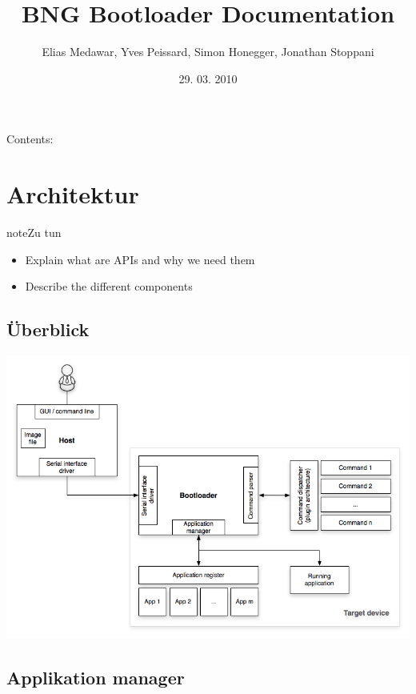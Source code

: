 \documentclass[letterpaper,10pt,ngerman]{manual}
\title{BNG Bootloader Documentation}
\date{29. 03. 2010}
\author{Elias Medawar, Yves Peissard, Simon Honegger, Jonathan Stoppani}
\begin{document}
\maketitle
\tableofcontents
\hypertarget{--doc-index}{}


Contents:

\resetcurrentobjects
\hypertarget{--doc-architecture/index}{}

\chapter{Architektur}
\hypertarget{todo-0}{}
\begin{notice}{note}{Zu tun}
\begin{itemize}
\item {} 
Explain what are APIs and why we need them

\item {} 
Describe the different components

\end{itemize}
\end{notice}


\section{Überblick}

\includegraphics{overview.png}


\section{Applikation manager}
\end{document}
